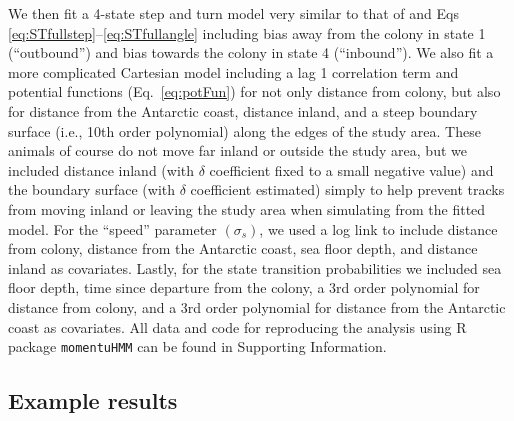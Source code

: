 \documentclass[12pt]{article}\usepackage[]{graphicx}\usepackage[]{xcolor}
\begin{document}
We then fit a 4-state step and turn model very similar to that of \citet{MichelotEtAl2017} and Eqs \ref{eq:STfullstep}--\ref{eq:STfullangle} including bias away from the colony in state 1 (``outbound'') and bias towards the colony in state 4 (``inbound''). We also fit a more complicated Cartesian model including a lag 1 correlation term and potential functions (Eq.\ \ref{eq:potFun}) for not only distance from colony, but also for distance from the Antarctic coast, distance inland, and a steep boundary surface (i.e., 10th order polynomial) along the edges of the study area. These animals of course do not move far inland or outside the study area, but we included distance inland (with $\delta$ coefficient fixed to a small negative value) and the boundary surface (with $\delta$ coefficient estimated) simply to help prevent tracks from moving inland or leaving the study area when simulating from the fitted model. For the ``speed'' parameter $(\sigma_s)$, we used a log link to include distance from colony, distance from the Antarctic coast, sea floor depth, and distance inland as covariates. Lastly, for the state transition probabilities we included sea floor depth, time since departure from the colony, a 3rd order polynomial for distance from colony, and a 3rd order polynomial for distance from the Antarctic coast as covariates. All data and code for reproducing the analysis using R package \verb|momentuHMM| can be found in Supporting Information.

\subsection{Example results}
\end{document}
